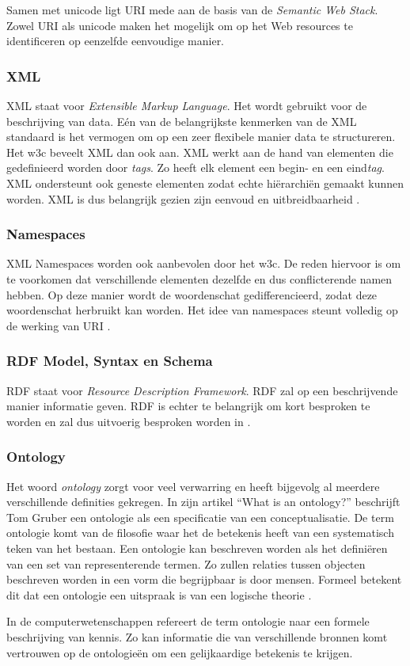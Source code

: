 Samen met unicode ligt URI mede aan de basis van de \textit{Semantic Web Stack}. Zowel URI als unicode maken het mogelijk om op het Web resources te identificeren op eenzelfde eenvoudige manier.

\subsubsection{XML}
XML staat voor \textit{Extensible Markup Language}. Het wordt gebruikt voor de beschrijving van data. Eén van de belangrijkste kenmerken van de XML standaard is het vermogen om op een zeer flexibele manier data te structureren. Het \acrfull{w3c} beveelt XML dan ook aan. XML werkt aan de hand van elementen die gedefinieerd worden door \textit{tags}. Zo heeft elk element een begin- en een eind\textit{tag}. XML ondersteunt ook geneste elementen zodat echte hiërarchiën gemaakt kunnen worden. XML is dus belangrijk gezien zijn eenvoud en uitbreidbaarheid \cite{bray2000extensible}. 

\subsubsection{Namespaces}
XML Namespaces worden ook aanbevolen door het \acrshort{w3c}. De reden hiervoor is om te voorkomen dat verschillende elementen dezelfde en dus conflicterende namen hebben. Op deze manier wordt de woordenschat gedifferencieerd, zodat deze woordenschat herbruikt kan worden. Het idee van namespaces steunt volledig op de werking van URI \cite{bray1999namespaces}.

\subsubsection{RDF Model, Syntax en Schema}
RDF staat voor \textit{Resource Description Framework}. RDF zal op een beschrijvende manier informatie geven. RDF is echter te belangrijk om kort besproken te worden en zal dus uitvoerig besproken worden in .

\subsubsection{Ontology}
\label{subsubsec:ontology}
Het woord \textit{ontology} zorgt voor veel verwarring en heeft bijgevolg al meerdere verschillende definities gekregen. In zijn artikel ``What is an ontology?'' beschrijft Tom Gruber een ontologie als een specificatie van een conceptualisatie. De term ontologie komt van de filosofie waar het de betekenis heeft van een systematisch teken van het bestaan. Een ontologie kan beschreven worden als het definiëren van een set van representerende termen. Zo zullen relaties tussen objecten beschreven worden in een vorm die begrijpbaar is door mensen. Formeel betekent dit dat een ontologie een uitspraak is van een logische theorie \cite{gruber2018ontology}. 

In de computerwetenschappen refereert de term ontologie naar een formele beschrijving van kennis. Zo kan informatie die van verschillende bronnen komt vertrouwen op de ontologieën om een gelijkaardige betekenis te krijgen.